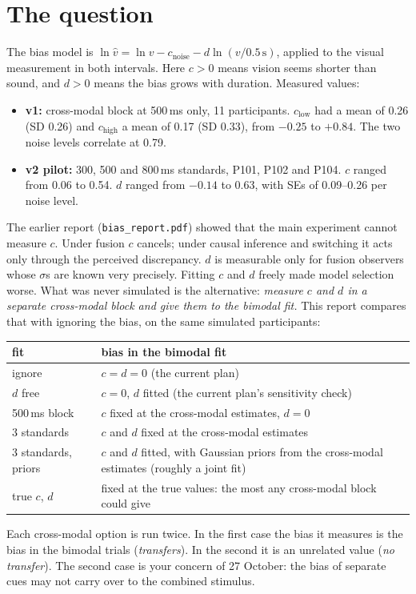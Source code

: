\documentclass[11pt,a4paper]{article}
\begin{document}
\section{The question}\label{sec:question}
The bias model is $\ln \hat v = \ln v - c_\text{noise} - d \ln(v / 0.5\,\text{s})$, applied to the visual measurement in both intervals. Here $c > 0$ means vision seems shorter than sound, and $d > 0$ means the bias grows with duration. Measured values:
\begin{itemize}
\item \textbf{v1:} cross-modal block at 500\,ms only, 11 participants. $c_\text{low}$ had a mean of 0.26 (SD 0.26) and $c_\text{high}$ a mean of 0.17 (SD 0.33), from $-0.25$ to $+0.84$. The two noise levels correlate at 0.79.
\item \textbf{v2 pilot:} 300, 500 and 800\,ms standards, P101, P102 and P104. $c$ ranged from 0.06 to 0.54. $d$ ranged from $-0.14$ to 0.63, with SEs of 0.09--0.26 per noise level.
\end{itemize}

The earlier report (\texttt{bias\_report.pdf}) showed that the main experiment cannot measure $c$. Under fusion $c$ cancels; under causal inference and switching it acts only through the perceived discrepancy. $d$ is measurable only for fusion observers whose $\sigma$s are known very precisely. Fitting $c$ and $d$ freely made model selection worse. What was never simulated is the alternative: \emph{measure $c$ and $d$ in a separate cross-modal block and give them to the bimodal fit.} This report compares that with ignoring the bias, on the same simulated participants:
\begin{center}
\begin{tabular}{lp{10.6cm}}
\toprule
fit & bias in the bimodal fit \\
\midrule
ignore & $c = d = 0$ (the current plan) \\
$d$ free & $c = 0$, $d$ fitted (the current plan's sensitivity check) \\
500\,ms block & $c$ fixed at the cross-modal estimates, $d = 0$ \\
3 standards & $c$ and $d$ fixed at the cross-modal estimates \\
3 standards, priors & $c$ and $d$ fitted, with Gaussian priors from the cross-modal estimates (roughly a joint fit) \\
true $c$, $d$ & fixed at the true values: the most any cross-modal block could give \\
\bottomrule
\end{tabular}
\end{center}
Each cross-modal option is run twice. In the first case the bias it measures is the bias in the bimodal trials (\emph{transfers}). In the second it is an unrelated value (\emph{no transfer}). The second case is your concern of 27 October: the bias of separate cues may not carry over to the combined stimulus.
\end{document}
